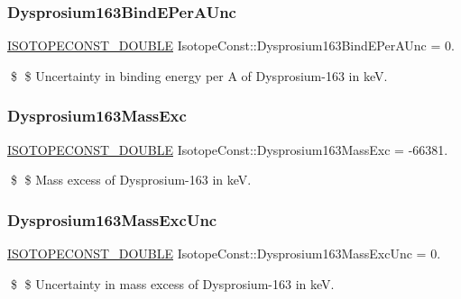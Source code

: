 \subsubsection{\texorpdfstring{Dysprosium163\+Bind\+E\+Per\+A\+Unc}{Dysprosium163BindEPerAUnc}}
{\footnotesize\ttfamily \mbox{\hyperlink{group___isotope_const-_macros_ga8f45a7272ce02c0b4c65c44636ed719a}{I\+S\+O\+T\+O\+P\+E\+C\+O\+N\+S\+T\+\_\+\+D\+O\+U\+B\+LE}} Isotope\+Const\+::\+Dysprosium163\+Bind\+E\+Per\+A\+Unc = 0.}

\$ \$ Uncertainty in binding energy per A of Dysprosium-\/163 in keV. \mbox{\label{group___isotope_const-_dysprosium-_dy163_gae87152d66d2ab85ec69774c7cd0b8a50}} 
\subsubsection{\texorpdfstring{Dysprosium163\+Mass\+Exc}{Dysprosium163MassExc}}
{\footnotesize\ttfamily \mbox{\hyperlink{group___isotope_const-_macros_ga8f45a7272ce02c0b4c65c44636ed719a}{I\+S\+O\+T\+O\+P\+E\+C\+O\+N\+S\+T\+\_\+\+D\+O\+U\+B\+LE}} Isotope\+Const\+::\+Dysprosium163\+Mass\+Exc = -\/66381.}

\$ \$ Mass excess of Dysprosium-\/163 in keV. \mbox{\label{group___isotope_const-_dysprosium-_dy163_ga4f32e2e5c3070d7a6d3a544779773b67}} 
\subsubsection{\texorpdfstring{Dysprosium163\+Mass\+Exc\+Unc}{Dysprosium163MassExcUnc}}
{\footnotesize\ttfamily \mbox{\hyperlink{group___isotope_const-_macros_ga8f45a7272ce02c0b4c65c44636ed719a}{I\+S\+O\+T\+O\+P\+E\+C\+O\+N\+S\+T\+\_\+\+D\+O\+U\+B\+LE}} Isotope\+Const\+::\+Dysprosium163\+Mass\+Exc\+Unc = 0.}

\$ \$ Uncertainty in mass excess of Dysprosium-\/163 in keV. \mbox{\label{group___isotope_const-_dysprosium-_dy163_ga35ff0ac94f3ffc00e1fb213763280652}} 
